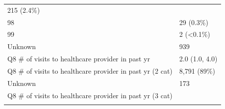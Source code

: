 \documentclass[]{article}
\begin{document}
\begin{longtable}[]{@{}ll@{}}
\begin{minipage}[t]{0.23\columnwidth}
215 (2.4\%)\strut
\end{minipage}\tabularnewline
\begin{minipage}[t]{0.71\columnwidth}\raggedright
98\strut
\end{minipage} & \begin{minipage}[t]{0.23\columnwidth}\raggedright
29 (0.3\%)\strut
\end{minipage}\tabularnewline
\begin{minipage}[t]{0.71\columnwidth}\raggedright
99\strut
\end{minipage} & \begin{minipage}[t]{0.23\columnwidth}\raggedright
2 (\textless0.1\%)\strut
\end{minipage}\tabularnewline
\begin{minipage}[t]{0.71\columnwidth}\raggedright
Unknown\strut
\end{minipage} & \begin{minipage}[t]{0.23\columnwidth}\raggedright
939\strut
\end{minipage}\tabularnewline
\begin{minipage}[t]{0.71\columnwidth}\raggedright
Q8 \# of visits to healthcare provider in past yr\strut
\end{minipage} & \begin{minipage}[t]{0.23\columnwidth}\raggedright
2.0 (1.0, 4.0)\strut
\end{minipage}\tabularnewline
\begin{minipage}[t]{0.71\columnwidth}\raggedright
Q8 \# of visits to healthcare provider in past yr (2 cat)\strut
\end{minipage} & \begin{minipage}[t]{0.23\columnwidth}\raggedright
8,791 (89\%)\strut
\end{minipage}\tabularnewline
\begin{minipage}[t]{0.71\columnwidth}\raggedright
Unknown\strut
\end{minipage} & \begin{minipage}[t]{0.23\columnwidth}\raggedright
173\strut
\end{minipage}\tabularnewline
\begin{minipage}[t]{0.71\columnwidth}\raggedright
Q8 \# of visits to healthcare provider in past yr (3 cat)\strut
\end{minipage} & \begin{minipage}[t]{0.23\columnwidth}\raggedright
\strut
\end{minipage}\tabularnewline
\begin{minipage}[t]{0.71\columnwidth}\raggedright

\end{minipage}
\end{longtable}
\end{document}
